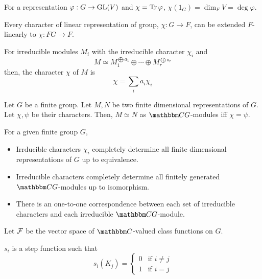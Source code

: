 \documentclass{article}
\begin{document}
\begin{lemma}
  For a representation \(\varphi: G \to \textnormal{GL}(V)\)
  and \(\chi = \operatorname{Tr} \varphi\), 
  \(\chi(1_G) = \dim_F V = \deg \varphi\).
\end{lemma}

\begin{theorem}
  Every character of linear representation of group, \(\chi: G \to F\),
  can be extended \(F\)-linearly to \(\chi: FG \to F\).
\end{theorem}

\begin{theorem}
  For irreducible modules \(M_i\) with the irreducible character \(\chi_i\)
  and
  \[M \simeq M_1^{\bigoplus a_1} \oplus \cdots \oplus M_r^{\bigoplus a_r}\]
  then, the character \(\chi\) of \(M\) is
  \[\chi = \sum_i a_i \chi_i\]
\end{theorem}

\begin{theorem}
  Let \(G\) be a finite group.
  Let \(M, N\) be two finite dimensional representations of \(G\).
  Let \(\chi, \psi\) be their characters.
  Then, \(M \simeq N\) as \(\bbC G\)-modules iff \(\chi = \psi\).
\end{theorem}

\begin{corollary}
  For a given finite group \(G\),
  \begin{itemize}
  \item Irrducible characters \(\chi_i\) completely determine all finite dimensional representations of \(G\) up to equivalence.
  \item Irreducible characters completely determine all finitely generated \(\bbC G\)-modules up to isomorphism.
  \item There is an one-to-one correspondence between each set of irreducible characters and each irreducible \(\bbC G\)-module.
  \end{itemize}
\end{corollary}

\begin{definition}
  Let \(\mathcal{F}\) be the vector space of \(\bbC\)-valued class functions on \(G\).
\end{definition}

\begin{definition}
  \(s_i\) is a step function such that
  \[s_i(K_j) = \left\{\begin{array}{ll}
    0 & \text{if } i \neq j \\
    1 & \text{if } i = j
  \end{array}\right.\]
\end{definition}
\end{document}
